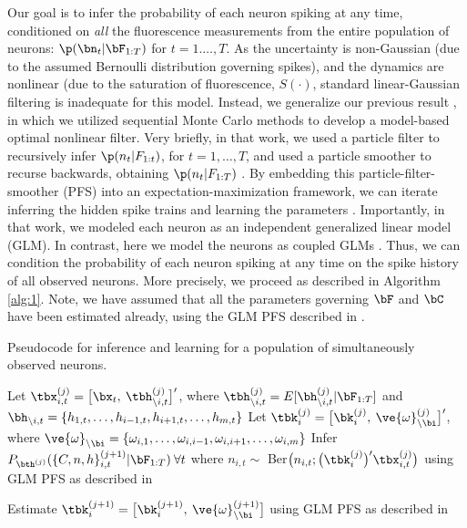 Our goal is to infer the probability of each neuron spiking at any time, conditioned on \emph{all} the fluorescence measurements from the entire population of neurons: $\p(\bn_t | \bF_{1:T})$ for $t = 1. \ldots, T$.  As the uncertainty is non-Gaussian (due to the assumed Bernoulli distribution governing spikes), and the dynamics are nonlinear (due to the saturation of fluorescence, $S(\cdot)$, standard linear-Gaussian filtering is inadequate for this model.  Instead, we generalize our previous result \cite{BJ08}, in which we utilized sequential Monte Carlo methods to develop a model-based optimal nonlinear filter.  Very briefly, in that work, we used a particle filter to recursively infer $\p(n_t | F_{1:t})$, for $t=1, \ldots, T$, and used a particle smoother to recurse backwards, obtaining $\p(n_t | F_{1:T})$ \cite{DoucetGordon01}.  By embedding this particle-filter-smoother (PFS) into an expectation-maximization framework, we can iterate inferring the hidden spike trains and learning the parameters \cite{DoucetGordon01}.  Importantly, in that work, we modeled each neuron as an independent generalized linear model (GLM).  In contrast, here we model the neurons as coupled GLMs \cite{Paninski04c, TruccoloBrown05, Pillow08}.  Thus, we can condition the probability of each neuron spiking at any time on the spike history of all observed neurons. More precisely, we proceed as described in Algorithm \ref{alg:1}.  Note, we have assumed that all the parameters governing $\bF$ and $\bC$ have been estimated already, using the GLM PFS described in \cite{BJ08}.

\begin{algorithm}
\caption{Pseudocode for inference and learning for a population of simultaneously observed neurons.  } \label{alg:1}
\begin{algorithmic}[1]
\STATE Let $\tbx_{i,t}^{(j)}=\big[\bx_t,\: \tbh_{\backslash i,t}^{(j)}\big]'$, where $\tbh_{\backslash i, t}^{(j)}=E[\bh_{\backslash i,t}^{(j)} | \bF_{1:T}]$ and $\bh_{\backslash i,t}=\{h_{1,t}, \ldots, h_{i-1,t}, h_{i+1,t}, \ldots, h_{m,t}\}$
\STATE Let $\tbk_i^{(j)}=\big[\bk_i^{(j)},\: \ve{\omega}_{\backslash \bi}^{(j)}\big]'$, where $\ve{\omega}_{\backslash \bi}=\{\omega_{i,1}, \ldots, \omega_{i,i-1}, \omega_{i,i+1}, \ldots, \omega_{i,m}\}$
\STATE Infer $P_{\bth^{(j)}} (\{C,n,h\}_{i,t}^{(j+1)} | \bF_{1:T}) \: \forall t$ where $n_{i,t} \sim $ Ber$\big(n_{i,t}; \big(\tbk_i^{(j)}\big)' \tbx_{i,t}^{(j)}\big)$ using GLM PFS as described in \cite{BJ08}
\ENDFOR

\STATE  Estimate $\tbk_i^{(j+1)}=\big[\bk_i^{(j+1)}, \: \ve{\omega}_{\backslash \bi}^{(j+1)}\big]$ using GLM PFS as described in \cite{BJ08}
\ENDFOR

\ENDWHILE
\end{algorithmic} 
\end{algorithm}

